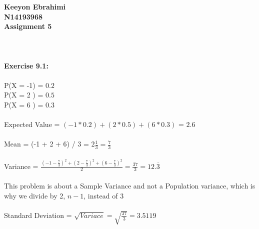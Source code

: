 \documentclass[11pt]{article}
\begin{document}
\textbf{Keeyon Ebrahimi}\\
\textbf{N14193968}\\
\textbf{Assignment 5}\\
\\ \\ \\
\textbf{Exercise 9.1:}\\
\\
P(X = -1) = $0.2$\\
P(X = 2 ) = $0.5$\\
P(X = 6 ) = $0.3$ \\
\\
Expected Value = $(-1 * 0.2) + (2 * 0.5) + (6 * 0.3)$ = \textbf{$2.6$} 
\\\\
Mean = {\Large (-1 + 2 + 6) / 3 = $2\frac{1}{3} = \frac{7}{3}$}
\\\\
Variance = {\huge $\frac{(-1 - \frac{7}{3}) ^ 2 + (2 - \frac{7}{3}) ^ 2 + (6 - \frac{7}{3}) ^ 2}{2} = \frac{37}{3} = 12.\overline{3}$ }
\\\\
This problem is about a Sample Variance and not a Population variance, which is why we divide by 2, $n - 1$, instead of $3$
\\\\
Standard Deviation = {\large $\sqrt{Variace} = \sqrt{\frac{37}{3}} = 3.5119 $ }
\newpage
\end{document}
